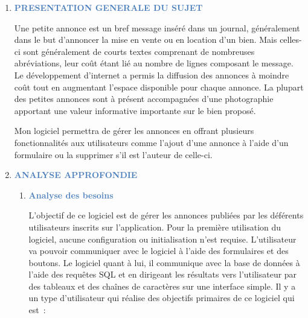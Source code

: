 \documentclass[12pt]{report}
\begin{document}
\begin{enumerate}[label*={\fontsize{12pt}{12pt}\selectfont \textbf{\arabic*.}}]
\vspace{\baselineskip}
\setlength{\parskip}{5.04pt}
	\item {\fontsize{18pt}{21.6pt}\selectfont \textbf{\textcolor[HTML]{4F81BD}{PRESENTATION GENERALE DU SUJET}}\par}\par

\setlength{\parskip}{9.96pt}
\begin{justify}
Une petite annonce est un bref message inséré dans un journal, généralement dans le but d'annoncer la mise en vente ou en location d'un bien. Mais celles-ci sont généralement de courts textes comprenant de nombreuses abréviations, leur coût étant lié au nombre de lignes composant le message. Le développement d'internet a permis la diffusion des annonces à moindre coût tout en augmentant l'espace disponible pour chaque annonce. La plupart des petites annonces sont à présent accompagnées d'une photographie apportant une valeur informative importante sur le bien proposé.
\end{justify}\par

\begin{justify}
Mon logiciel permettra de gérer les annonces en offrant plusieurs fonctionnalités aux utilisateurs comme l’ajout d’une annonce à l’aide d’un formulaire ou la supprimer s’il est l’auteur de celle-ci. 
\end{justify}\par


\vspace{\baselineskip}
\setlength{\parskip}{5.04pt}
	\item {\fontsize{18pt}{21.6pt}\selectfont \textbf{\textcolor[HTML]{4F81BD}{ANALYSE APPROFONDIE}}\par}\par

\setlength{\parskip}{9.96pt}
\begin{enumerate}[label*={\fontsize{16pt}{16pt}\selectfont \textbf{\arabic*.}}]
	\item {\fontsize{16pt}{19.2pt}\selectfont \textbf{\textcolor[HTML]{4F81BD}{Analyse des besoins}}\par}\par


\vspace{\baselineskip}
L’objectif de ce logiciel est de gérer les annonces publiées par les déférents utilisateurs inscrits sur l’application. Pour la première utilisation\textbf{ }du logiciel, aucune configuration ou initialisation n’est requise. L’utilisateur va pouvoir communiquer avec le logiciel à l’aide des formulaires et des boutons. Le logiciel quant à lui, il communique avec la base de données à l’aide des requêtes SQL et en dirigeant les résultats vers l’utilisateur par des tableaux et des chaînes de caractères sur une interface simple. Il y a un type d’utilisateur qui réalise des objectifs primaires de ce logiciel qui est :\par



\end{enumerate}
\end{enumerate}
\end{document}
